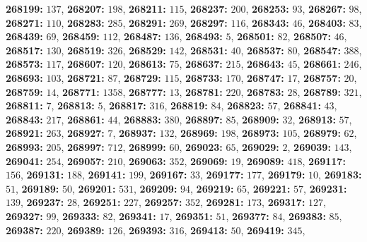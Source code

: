 \textsf{\bfseries 268199:} $137$, \textsf{\bfseries 268207:} $198$, \textsf{\bfseries 268211:} $115$, \textsf{\bfseries 268237:} $200$, \textsf{\bfseries 268253:} $93$, \textsf{\bfseries 268267:} $98$, \textsf{\bfseries 268271:} $110$, \textsf{\bfseries 268283:} $285$, \textsf{\bfseries 268291:} $269$, \textsf{\bfseries 268297:} $116$, \textsf{\bfseries 268343:} $46$, \textsf{\bfseries 268403:} $83$, \textsf{\bfseries 268439:} $69$, \textsf{\bfseries 268459:} $112$, \textsf{\bfseries 268487:} $136$, \textsf{\bfseries 268493:} $5$, \textsf{\bfseries 268501:} $82$, \textsf{\bfseries 268507:} $46$, \textsf{\bfseries 268517:} $130$, \textsf{\bfseries 268519:} $326$, \textsf{\bfseries 268529:} $142$, \textsf{\bfseries 268531:} $40$, \textsf{\bfseries 268537:} $80$, \textsf{\bfseries 268547:} $388$, \textsf{\bfseries 268573:} $117$, \textsf{\bfseries 268607:} $120$, \textsf{\bfseries 268613:} $75$, \textsf{\bfseries 268637:} $215$, \textsf{\bfseries 268643:} $45$, \textsf{\bfseries 268661:} $246$, \textsf{\bfseries 268693:} $103$, \textsf{\bfseries 268721:} $87$, \textsf{\bfseries 268729:} $115$, \textsf{\bfseries 268733:} $170$, \textsf{\bfseries 268747:} $17$, \textsf{\bfseries 268757:} $20$, \textsf{\bfseries 268759:} $14$, \textsf{\bfseries 268771:} $1358$, \textsf{\bfseries 268777:} $13$, \textsf{\bfseries 268781:} $220$, \textsf{\bfseries 268783:} $28$, \textsf{\bfseries 268789:} $321$, \textsf{\bfseries 268811:} $7$, \textsf{\bfseries 268813:} $5$, \textsf{\bfseries 268817:} $316$, \textsf{\bfseries 268819:} $84$, \textsf{\bfseries 268823:} $57$, \textsf{\bfseries 268841:} $43$, \textsf{\bfseries 268843:} $217$, \textsf{\bfseries 268861:} $44$, \textsf{\bfseries 268883:} $380$, \textsf{\bfseries 268897:} $85$, \textsf{\bfseries 268909:} $32$, \textsf{\bfseries 268913:} $57$, \textsf{\bfseries 268921:} $263$, \textsf{\bfseries 268927:} $7$, \textsf{\bfseries 268937:} $132$, \textsf{\bfseries 268969:} $198$, \textsf{\bfseries 268973:} $105$, \textsf{\bfseries 268979:} $62$, \textsf{\bfseries 268993:} $205$, \textsf{\bfseries 268997:} $712$, \textsf{\bfseries 268999:} $60$, \textsf{\bfseries 269023:} $65$, \textsf{\bfseries 269029:} $2$, \textsf{\bfseries 269039:} $143$, \textsf{\bfseries 269041:} $254$, \textsf{\bfseries 269057:} $210$, \textsf{\bfseries 269063:} $352$, \textsf{\bfseries 269069:} $19$, \textsf{\bfseries 269089:} $418$, \textsf{\bfseries 269117:} $156$, \textsf{\bfseries 269131:} $188$, \textsf{\bfseries 269141:} $199$, \textsf{\bfseries 269167:} $33$, \textsf{\bfseries 269177:} $177$, \textsf{\bfseries 269179:} $10$, \textsf{\bfseries 269183:} $51$, \textsf{\bfseries 269189:} $50$, \textsf{\bfseries 269201:} $531$, \textsf{\bfseries 269209:} $94$, \textsf{\bfseries 269219:} $65$, \textsf{\bfseries 269221:} $57$, \textsf{\bfseries 269231:} $139$, \textsf{\bfseries 269237:} $28$, \textsf{\bfseries 269251:} $227$, \textsf{\bfseries 269257:} $352$, \textsf{\bfseries 269281:} $173$, \textsf{\bfseries 269317:} $127$, \textsf{\bfseries 269327:} $99$, \textsf{\bfseries 269333:} $82$, \textsf{\bfseries 269341:} $17$, \textsf{\bfseries 269351:} $51$, \textsf{\bfseries 269377:} $84$, \textsf{\bfseries 269383:} $85$, \textsf{\bfseries 269387:} $220$, \textsf{\bfseries 269389:} $126$, \textsf{\bfseries 269393:} $316$, \textsf{\bfseries 269413:} $50$, \textsf{\bfseries 269419:} $345$, 
